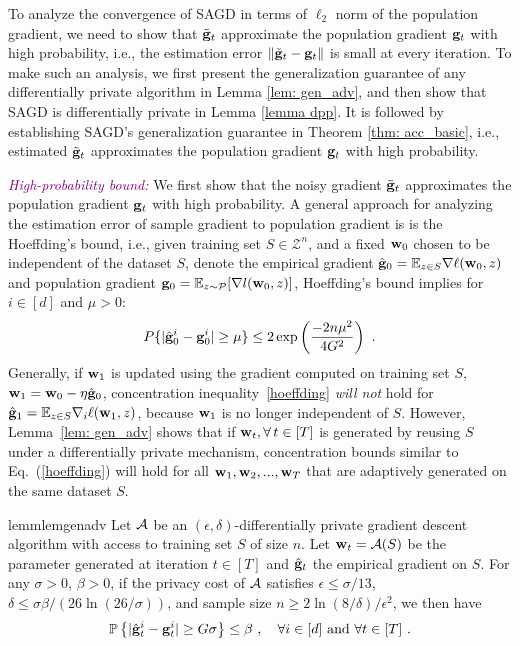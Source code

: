 \documentclass[11pt]{article}
\begin{document}
To analyze the convergence of SAGD in terms of $\ell_2$ norm of the population gradient, we need to 
show that $\tilde {\mathbf{g}}_t$ approximate the population gradient $\mathbf{g}_t$ with high probability, i.e., the estimation error $\| \tilde {\mathbf{g}}_t - \mathbf{g}_t\|$ is small at every iteration.  To make such an analysis, we first present the generalization guarantee of any differentially private algorithm in Lemma \ref{lem: gen_adv}, and then show that SAGD is differentially private in Lemma \ref{lemma dpp}. It is followed by establishing SAGD's generalization guarantee in Theorem \ref{thm: acc_basic}, i.e., estimated $\tilde {\mathbf{g}}_t$ approximates the population gradient $\mathbf{g}_t$ with high probability.

\textcolor{purple}{\textit{High-probability bound:}} 
We first show that the noisy gradient $\tilde {\mathbf{g}}_t$ approximates the population gradient $\mathbf{g}_t$ with high probability.
A general approach for analyzing the estimation error
of sample gradient to population gradient is is the Hoeffding's bound, i.e., given training set $S \in \mathcal{Z}^n$, and a fixed $\mathbf{w}_0$ chosen to be independent of the dataset $S$, denote the empirical gradient $\hat {\mathbf{g}}_0= \mathbb{E}_{z \in S}\nabla \ell(\mathbf{w}_0,z)$ and population gradient $\mathbf{g}_0 = \mathbb{E}_{z\sim \mathcal{P}}[\nabla l(\mathbf{w}_0,z)]$, Hoeffding's bound implies for  $i \in [d]$ and $\mu > 0$:
\begin{equation} \label{hoeffding}
P\{|\hat {\mathbf{g}}^i_0 - \mathbf{g}_0^i | \geq \mu \} \leq2 \exp \left(\frac{-2n\mu^2}{4G^2} \right)~.
\end{equation}
Generally, if $\mathbf{w}_1$ is updated using the gradient computed on training set $S$, \ie $\mathbf{w}_1 = \mathbf{w}_0 - \eta \hat {\mathbf{g}}_0$, concentration inequality~\eqref{hoeffding} \emph{will not} hold for $\hat {\mathbf{g}}_1 = \mathbb{E}_{z \in S}\nabla_i \ell(\mathbf{w}_1,z)$, because $\mathbf{w}_1$ is no longer independent of $S$. 
However, Lemma~\ref{lem: gen_adv} shows that if $\mathbf{w}_t, \forall\, t \in [T]$ is generated by reusing $S$ under a differentially private mechanism, concentration bounds similar to Eq.~(\ref{hoeffding}) will hold for all $\mathbf{w}_1, \mathbf{w}_2,...,\mathbf{w}_T$ that are adaptively generated on the same dataset $S$. 
\begin{restatable}{lemm}{lemgenadv}
\label{lem: gen_adv}
	Let $\cA$ be an $(\epsilon, \delta)$-differentially private gradient descent algorithm with access to training set $S$ of size $n$. Let $\w_t = \cA(S)$ be the parameter generated at iteration $t \in [T]$ and $\hat {\mathbf{g}}_t$ the empirical gradient on $S$. For any $\sigma >0$, $\beta > 0$, if the privacy cost of $\cA$ satisfies $\epsilon \leq \sigma/13$, $\delta \leq \sigma \beta/(26 \ln(26/\sigma))$, and sample size $n \geq 2\ln(8/\delta)/\epsilon^2$, we then have
	\begin{equation*}
	\mathbb{P}\left\{ |\hat {\mathbf{g}}_t^i - \mathbf{g}_t^i| \geq  G \sigma \right\} \leq \beta~, \quad \textrm{$ \forall i\in [d]$ and  $\forall t \in [T]$} ~.
	\end{equation*} 
\end{restatable}
\end{document}
